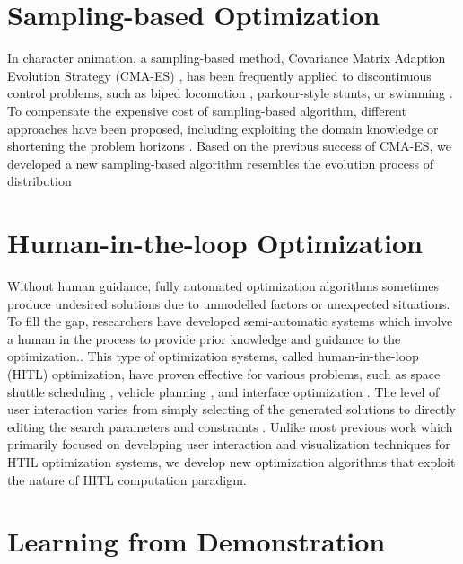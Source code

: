 \section{Sampling-based Optimization}
In character animation, a sampling-based method, 
Covariance Matrix Adaption Evolution Strategy (CMA-ES) 
\cite{Hansen:2004:CMA}, has been
frequently applied to discontinuous control problems, such as biped
locomotion \cite{Wang:2009:OWC,Wang:2010:OWC,Wang:2012:OLC},
parkour-style stunts\cite{Liu:2012:TRC,Ha:2014:ITD}, or swimming
\cite{Tan:2011:ASC}.  To compensate the expensive cost of
sampling-based algorithm, different approaches have been proposed,
including exploiting the domain knowledge
\cite{Wang:2009:OWC,Wang:2010:OWC,Wang:2012:OLC} or shortening the
problem horizons \cite{Sok:2007:SBB}. Based on the previous success
of CMA-ES, we developed a new sampling-based algorithm resembles the
evolution process of distribution

\section{Human-in-the-loop Optimization}

Without human guidance, fully automated optimization algorithms
sometimes produce undesired solutions due to unmodelled factors or
unexpected situations. To fill the gap, researchers have developed
semi-automatic systems which involve a human in the process to provide
prior knowledge and guidance to the
optimization.\cite{Scott:2002:IHC}. 
This type of optimization systems, called human-in-the-loop (HITL)
optimization, have proven effective for various problems, such as
space shuttle scheduling \cite{Chien:1999:APS}, vehicle planning
\cite{Waters:1984:IVR}, and interface optimization
\cite{Quiroz:2007:IEX}.  The level of user interaction
varies from simply selecting of the generated solutions
\cite{Sims:1991:AEC} to directly editing the search parameters and
constraints \cite{Sreevalsan-Nair:2007:HGE}. Unlike
most previous work which primarily focused on developing user
interaction and visualization techniques for HTIL optimization
systems, we develop new optimization algorithms that exploit the nature of
HITL computation paradigm.


\section{Learning from Demonstration}

